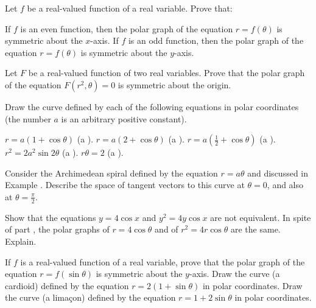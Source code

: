 \begin{exercises}
Let $f$ be a real-valued function of a real variable.
Prove that:
\begin{exenum}
\x
If $f$ is an even function, then the polar graph
of the equation $r=f(\theta)$ is symmetric
about the $x$-axis.
\x
If $f$ is an odd function, then the polar graph
of the equation $r = f(\theta)$ is symmetric
about the $y$-axis.
\end{exenum}

Let $F$ be a real-valued function of two real variables.
Prove that the polar graph of the equation
$F(r^2,\theta) = 0$ is symmetric about the origin.

Draw the curve defined by each of the following
equations in polar coordinates (the number
$a$ is an arbitrary positive constant).
\begin{exenum}
\x
$r=a(1+\cos\theta)$ (a ).
\x
$r=a(2+\cos\theta)$ (a ).
\x
$r=a(\frac12 + \cos\theta)$ (a ).
\x
$r^2 = 2a^2\sin2\theta$ (a ).
\x
$r\theta = 2$ (a ).
\end{exenum}

Consider the Archimedean spiral defined by
the equation $r=a\theta$ and discussed in
Example .
Describe the space of tangent vectors to this
curve at $\theta = 0$, and also at $\theta = \frac\pi2$.

\begin{exenum}
\x
{}
Show that the equations $y=4\cos x$ and
$y^2=4y\cos x$ are not equivalent.
\x
In spite of part , the polar graphs
of $r=4\cos\theta$ and of $r^2 = 4r\cos\theta$
are the same.  Explain.
\end{exenum}

\begin{exenum}
\x
If $f$ is a real-valued function of a real variable,
prove that the polar graph of the equation
$r=f(\sin\theta)$ is symmetric about the $y$-axis.
\x
Draw the curve (a cardioid) defined by the equation
$r=2(1+\sin\theta)$ in polar coordinates.
\x
Draw the curve (a lima\c{c}on) defined by the
equation $r=1+2\sin\theta$ in polar
coordinates.
\end{exenum}

\end{exercises}
